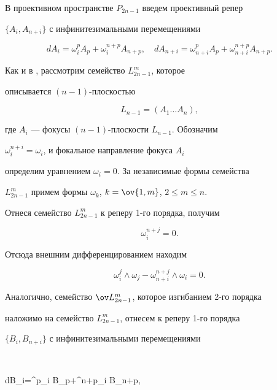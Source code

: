  


В проективном пространстве $P_{2n-1}$ введем проективный репер 


$\{A_i,A_{n+i}\}$ с инфинитезимальными перемещениями 


$$ 


dA_i=\omega^p_i A_p+\omega^{n+p}_i A_{n+p},\quad 


dA_{n+i}=\omega^p_{n+i}A_p+\omega^{n+p}_{n+i}A_{n+p}. 


$$ 


 


Как и в \cite{1}, рассмотрим семейство $L^m_{2n-1}$, которое 


описывается $(n-1)$-плоскостью 


$$ 


L_{n-1}=(A_1\dotsc A_n), 


$$ 


где $A_i$ --- фокусы $(n-1)$-плоскости $L_{n-1}$. Обозначим 


$\omega^{n+i}_i=\omega_i$, и фокальное направление фокуса $A_i$ 


определим уравнением $\omega_i=0$. За независимые формы семейства 


$L^m_{2n-1}$ примем формы $\omega_k$, $k=\ov{1,m}$, $2\le m\le n$. 


Отнеся семейство $L^m_{2n-1}$ к реперу 1-го порядка, получим 


\begin{equation} 


\omega^{n+j}_i=0. 


\end{equation} 


Отсюда внешним дифференцированием находим 


\begin{equation} 


\omega^j_i\wedge\omega_j-\omega^{n+j}_{n+i}\wedge\omega_i=0. 


\end{equation} 


 


Аналогично, семейство $\ov L^m_{2n-1}$, которое изгибанием 2-го порядка 


наложимо на семейство $L^m_{2n-1}$, отнесем к реперу 1-го порядка 


$\{B_i,B_{n+i}\}$ с инфинитезимальными перемещениями 


$$ 


dB_i=\Omega^p_i B_p+\Omega^{n+p}_i B_{n+p},\quad 


